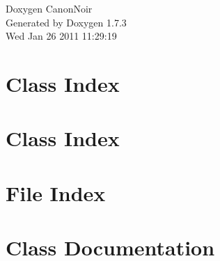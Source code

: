 \documentclass[a4paper]{book}
\begin{document}
\hypersetup{pageanchor=false}
\begin{titlepage}
\vspace*{7cm}
\begin{center}
{\Large Doxygen CanonNoir }\\
\vspace*{1cm}
{\large Generated by Doxygen 1.7.3}\\
\vspace*{0.5cm}
{\small Wed Jan 26 2011 11:29:19}\\
\end{center}
\end{titlepage}
\clearemptydoublepage
{}
\tableofcontents
\clearemptydoublepage
{}
\hypersetup{pageanchor=true}
\chapter{Class Index}

\chapter{Class Index}

\chapter{File Index}

\chapter{Class Documentation}

































\end{document}

